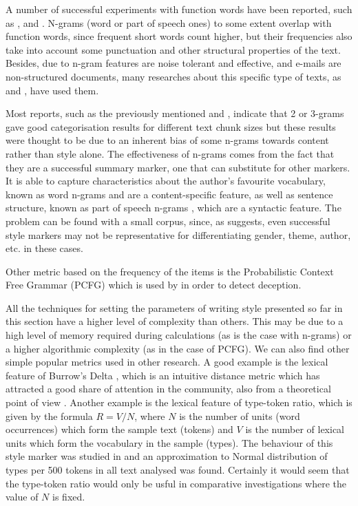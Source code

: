 A number of successful experiments with function words have been reported, such as \cite{craig1999authorial}, \cite{koppel2006feature} and \cite{de2001mining}. N-grams (word or part of speech ones) to some extent overlap with function words, since frequent short words count higher, but their frequencies also take into account some punctuation and other structural properties of the text. Besides, due to n-gram features are noise tolerant and effective, and e-mails are non-structured documents, many researches about this specific type of texts, as \cite{brocardo2013authorship} and \cite{corney2001identifying}, have used them.

Most reports, such as the previously mentioned \cite{kjell1994discrimination} and \cite{corney2001identifying}, indicate that 2 or 3-grams gave good categorisation results for different text chunk sizes but these results were thought to be due to an inherent bias of some n-grams towards content rather than style alone. The effectiveness of n-grams comes from the fact that they are a successful summary marker, one that can substitute for other markers. It is able to capture characteristics about the author's favourite vocabulary, known as word n-grams \citep{diederich2003authorship} and are a content-specific feature, as well as sentence structure, known as part of speech n-grams \citep{baayen1996outside, argamon1998routing}, which are a syntactic feature. The problem can be found with a small corpus, since, as \cite{baayen2000back} suggests, even successful style markers may not be representative for differentiating gender, theme, author, etc. in these cases.

Other metric based on the frequency of the items is the Probabilistic Context Free Grammar (PCFG) which is used by \cite{cfgstylo} in order to detect deception.

All the techniques for setting the parameters of writing style presented so far in this section have a higher level of complexity than others. This may be due to a high level of memory required during calculations (as is the case with n-grams) or a higher algorithmic complexity (as in the case of PCFG). We can also find other simple popular metrics used in other research. A good example is the lexical feature of Burrow's Delta \citep{burrows2002delta}, which is an intuitive distance metric which has attracted a good share of attention in the community, also from a theoretical point of view \citep{argamon2008interpreting, hoover2004testing, hoover2004delta}. Another example is the lexical feature of type-token ratio, which is given by the formula $R=V/N$, where $N$ is the number of units (word occurrences) which form the sample text (tokens) and $V$ is the number of lexical units which form the vocabulary in the sample (types). The behaviour of this style marker was studied in \cite{kjetsaa1979and} and an approximation to Normal distribution of types per 500 tokens in all text analysed was found. Certainly it would seem that the type-token ratio would only be usful in comparative investigations where the value of $N$ is fixed.

